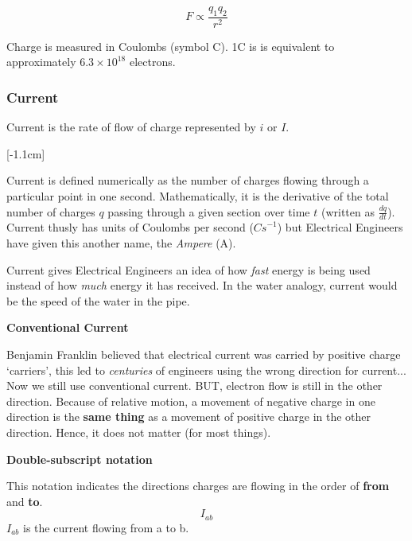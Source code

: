 \documentclass[12pt]{article}
\begin{document}
\begin{equation*}
  F \propto \frac{q_1q_2}{r^2}
\end{equation*}

Charge is measured in Coulombs (symbol C).
1C is is equivalent to approximately $6.3 \times 10^{18}$ electrons.

\subsubsection{Current}
\begin{definition*}
   Current is the rate of flow of charge represented by $i$ or $I$.
\end{definition*}

[-1.1cm]

Current is defined numerically as the number of charges flowing through a particular point in one second.
Mathematically, it is the derivative of the total number of charges $q$ passing through a given section over time $t$ (written as $\frac{dq}{dt}$).
Current thusly has units of Coulombs per second ($\unit{Cs}^{-1}$) but Electrical Engineers have given this another name, the \textit{Ampere} (A).


Current gives Electrical Engineers an idea of how \textit{fast} energy is being used instead of how \textit{much} energy it has received.
In the water analogy, current would be the speed of the water in the pipe. 

\begin{theorem*}
  \textbf{Conventional Current}

  Benjamin Franklin believed that electrical current was carried by positive charge `carriers', this led to \textit{centuries} of engineers using the wrong direction for current...
  Now we still use conventional current. BUT, electron flow is still in the other direction.
  Because of relative motion, a movement of negative charge in one direction is the \textbf{same thing} as a movement of positive charge in the other direction.
  Hence, it does not matter (for most things).
\end{theorem*}

\begin{theorem*}
  \textbf{Double-subscript notation}
  
  This notation indicates the directions charges are flowing in the order of \textbf{from} and \textbf{to}. 
  \begin{equation*}
    I_{ab} 
  \end{equation*}
  $I_{ab}$ is the current flowing from a to b.
\end{theorem*}
\end{document}
